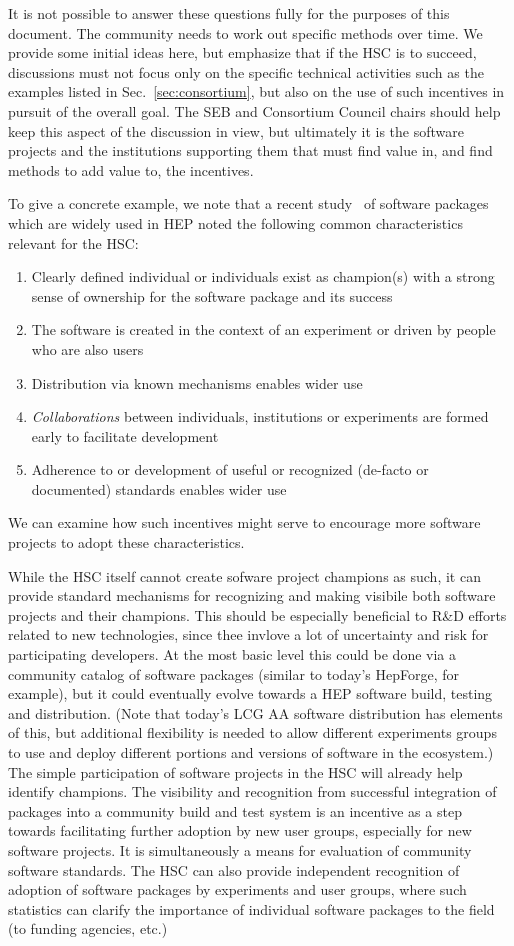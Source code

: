\documentclass[12pt,letterpaper,fleqn]{article}
\begin{document}
It is not possible to answer these questions fully for the purposes of  this document. The community needs to work out specific methods over time. 
We provide some initial ideas here, but emphasize that if the HSC is to 
succeed, discussions must not focus only on the specific technical 
activities such as the examples listed in Sec.~\ref{sec:consortium}, but also on the use of such incentives in pursuit 
of the 
overall goal. The SEB and Consortium Council chairs should help keep
this aspect of the discussion in view, but ultimately it is the software 
projects and the institutions supporting them that must find value in,
and find methods to add value to, the incentives.

To give a concrete example, we note that a recent study~\cite{TAXONOMY} of software packages which are 
widely used in HEP noted the following common characteristics relevant 
for the HSC:
\begin{enumerate}
\item Clearly defined individual or individuals exist as champion(s)
with a strong sense of ownership for the software package and its success
\item The software is created in the context of an experiment or
driven by people who are also users 
\item Distribution via known mechanisms enables wider use 
\item {\em Collaborations} between individuals, institutions or
experiments are formed early to facilitate development
\item Adherence to or development of useful or recognized (de-facto
or documented) standards enables wider use
\end{enumerate}
We can examine how such incentives might serve to encourage more software 
projects to adopt these characteristics.

While the HSC itself cannot create sofware project champions as such, 
it can provide standard mechanisms for recognizing and making
visibile both software projects and their champions.  This should be especially beneficial to R\&D efforts related to new technologies, since thee invlove a lot of uncertainty and risk for participating developers.
At the most basic level this could be done via a community catalog
of software packages (similar to today's HepForge, for example), but
it could eventually evolve towards a HEP software build, testing 
and distribution. (Note that today's LCG AA software distribution has 
elements of this, but additional flexibility is needed to allow different
experiments groups to use and deploy different portions and versions of
software in the ecosystem.) The simple participation of software 
projects in the HSC will already help identify champions. The visibility 
and recognition from successful integration of packages into a community 
build and test system is an incentive as a step towards facilitating
further adoption by new user groups, especially for new software projects. 
It is simultaneously a means for evaluation of community software 
standards. The HSC can also provide independent recognition of adoption 
of software packages by experiments and user groups, where such statistics
can clarify the importance of individual software packages to the field
(to funding agencies, etc.)
\end{document}
